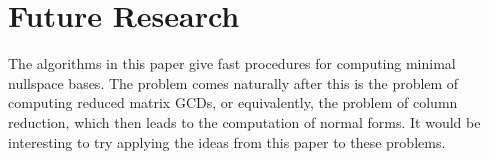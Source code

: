 
\section{Future Research\label{sec:Future-Research}}

The algorithms in this paper give fast procedures for computing minimal
nullspace bases. The problem comes naturally after this is the problem
of computing reduced matrix GCDs, or equivalently, the problem of
column reduction, which then leads to the computation of normal forms.
It would be interesting to try applying the ideas from this paper
to these problems.

